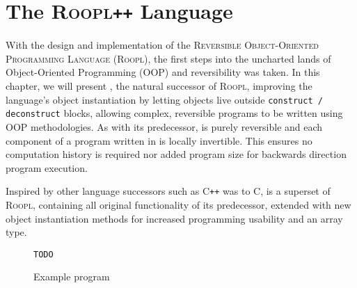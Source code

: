 \chapter{The \textsc{Roopl\texttt{++}} Language}
\label{chp:rooplpp}
With the design and implementation of the \textsc{Reversible Object-Oriented Programming Language} (\textsc{Roopl}), the first steps into the uncharted lands of Object-Oriented Programming (OOP) and reversibility was taken. In this chapter, we will present \rooplpp, the natural successor of \textsc{Roopl}, improving the language's object instantiation by letting objects live outside \texttt{construct / deconstruct} blocks, allowing complex, reversible programs to be written using OOP methodologies. As with its predecessor, \rooplpp is purely reversible and each component of a program written in \rooplpp is locally invertible. This ensures no computation history is required nor added program size for backwards direction program execution.

Inspired by other language successors such as \textsc{C\texttt{++}} was to \textsc{C}, \rooplpp is a superset of \textsc{Roopl}, containing all original functionality of its predecessor, extended with new object instantiation methods for increased programming usability and an array type.

\begin{figure}
    \texttt{TODO}
    \caption{Example \rooplpp program}    
\end{figure}
\newpage


